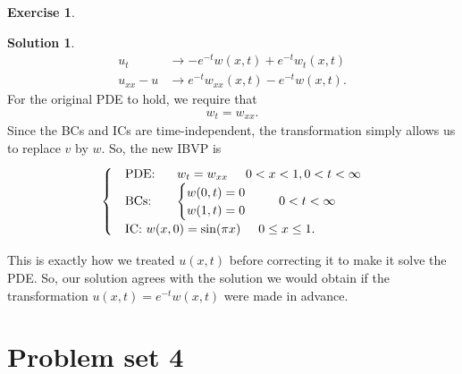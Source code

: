 \documentclass{book}
\theoremstyle{definition}
\newtheorem*{exer*}{Exercise}
\newtheorem*{sln*}{Solution}
\begin{document}
\begin{exer*}
\begin{sln*}
\begin{align*}
		u_t &\to -e^{-t}w(x,t) + e^{-t}w_t(x,t)\\
		u_{xx} - u &\to e^{-t}w_{xx}(x,t) - e^{-t}w(x,t).
		\end{align*}
		For the original PDE to hold, we require that
		\begin{align*}
		w_t = w_{xx}.
		\end{align*}
		Since the BCs and ICs are time-independent, the transformation simply allows us to replace $v$ by $w$. So, the new IBVP is
		\begin{align*}
		\begin{cases}
		&\text{PDE: }\hspace{0.5cm} w_t = w_{xx}\hspace{0.5cm} 0<x<1, 0 < t < \infty\\
		&\text{BCs: }\hspace{0.5cm} \begin{cases}
		w(0,t) = 0\\
		w(1,t) = 0
		\end{cases}\hspace{0.5cm} 0 < t < \infty\\
		&\text{IC: } w(x,0) = \sin(\pi x) \hspace{0.5cm} 0 \leq x \leq 1.
		\end{cases}
		\end{align*}
		
		This is exactly how we treated $u(x,t)$ before correcting it to make it solve the PDE. So, our solution agrees with the solution we would obtain if the transformation $u(x,t) = e^{-t}w(x,t)$ were made in advance.
		
	\end{sln*}
	
\end{exer*}


\newpage
\section{Problem set 4}
\end{document}
